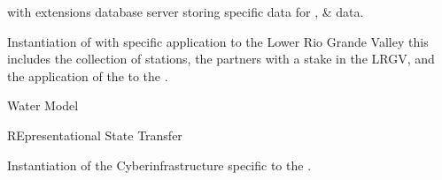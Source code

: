 \documentclass[letterpaper,12pt,english,openany,oneside]{sphinxmanual}
\begin{document}
\begin{description}
\sphinxAtStartPar
{\hyperref[\detokenize{glossary:term-PostgreSQL}]{}} with {\hyperref[\detokenize{glossary:term-PostGIS}]{}} extensions database server storing {\hyperref[\detokenize{glossary:term-REON}]{}} specific data for {\hyperref[\detokenize{glossary:term-RTHS}]{}}, {\hyperref[\detokenize{glossary:term-REON-WM}]{}} \& {\hyperref[\detokenize{glossary:term-REON.cc}]{}} data.

\sphinxAtStartPar
Instantiation of {\hyperref[\detokenize{glossary:term-REON}]{}} with specific application to the Lower Rio Grande Valley \sphinxhyphen{} this includes the collection of {\hyperref[\detokenize{glossary:term-RTHS}]{}} stations, the {\hyperref[\detokenize{glossary:term-REON}]{}} partners with a stake in the LRGV, and the application of the {\hyperref[\detokenize{glossary:term-REON-WM}]{}} to the {\hyperref[\detokenize{glossary:term-LRGV}]{}}.

\sphinxAtStartPar
{\hyperref[\detokenize{glossary:term-REON}]{}} Water Model

\sphinxAtStartPar
REpresentational State Transfer

\sphinxAtStartPar
Instantiation of the {\hyperref[\detokenize{glossary:term-REON}]{}} Cyberinfrastructure specific to the {\hyperref[\detokenize{glossary:term-LRGV}]{}}.


\end{description}
\end{document}

